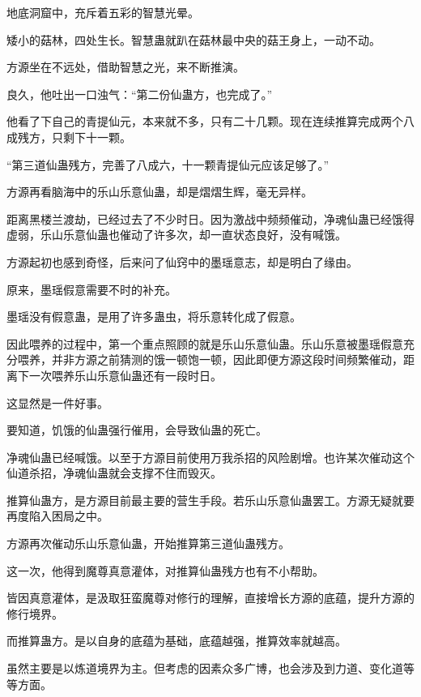 
\begin{this_body}

地底洞窟中，充斥着五彩的智慧光晕。

矮小的菇林，四处生长。智慧蛊就趴在菇林最中央的菇王身上，一动不动。

方源坐在不远处，借助智慧之光，来不断推演。

良久，他吐出一口浊气：“第二份仙蛊方，也完成了。”

他看了下自己的青提仙元，本来就不多，只有二十几颗。现在连续推算完成两个八成残方，只剩下十一颗。

“第三道仙蛊残方，完善了八成六，十一颗青提仙元应该足够了。”

方源再看脑海中的乐山乐意仙蛊，却是熠熠生辉，毫无异样。

距离黑楼兰渡劫，已经过去了不少时日。因为激战中频频催动，净魂仙蛊已经饿得虚弱，乐山乐意仙蛊也催动了许多次，却一直状态良好，没有喊饿。

方源起初也感到奇怪，后来问了仙窍中的墨瑶意志，却是明白了缘由。

原来，墨瑶假意需要不时的补充。

墨瑶没有假意蛊，是用了许多蛊虫，将乐意转化成了假意。

因此喂养的过程中，第一个重点照顾的就是乐山乐意仙蛊。乐山乐意被墨瑶假意充分喂养，并非方源之前猜测的饿一顿饱一顿，因此即便方源这段时间频繁催动，距离下一次喂养乐山乐意仙蛊还有一段时日。

这显然是一件好事。

要知道，饥饿的仙蛊强行催用，会导致仙蛊的死亡。

净魂仙蛊已经喊饿。以至于方源目前使用万我杀招的风险剧增。也许某次催动这个仙道杀招，净魂仙蛊就会支撑不住而毁灭。

推算仙蛊方，是方源目前最主要的营生手段。若乐山乐意仙蛊罢工。方源无疑就要再度陷入困局之中。

方源再次催动乐山乐意仙蛊，开始推算第三道仙蛊残方。

这一次，他得到魔尊真意灌体，对推算仙蛊残方也有不小帮助。

皆因真意灌体，是汲取狂蛮魔尊对修行的理解，直接增长方源的底蕴，提升方源的修行境界。

而推算蛊方。是以自身的底蕴为基础，底蕴越强，推算效率就越高。

虽然主要是以炼道境界为主。但考虑的因素众多广博，也会涉及到力道、变化道等等方面。


\end{this_body}
